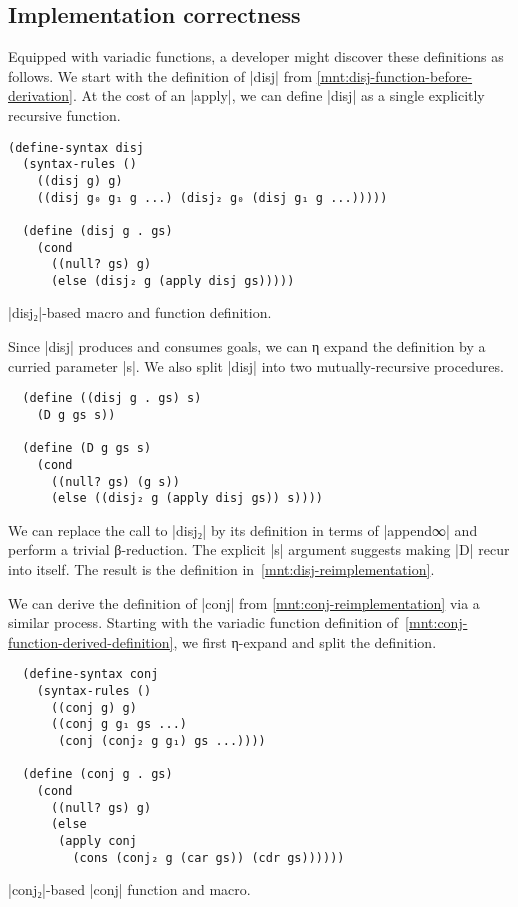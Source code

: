 \documentclass[sigplan,screen,draft,anonymous,review,natbib=false]{acmart}
\begin{document}
\subsection{Implementation correctness}

Equipped with variadic functions, a developer might discover these
definitions as follows. We start with the definition of
\rackinline|disj| from \cref{mnt:disj-function-before-derivation}. At
the cost of an \rackinline|apply|, we can define \rackinline|disj| as
a single explicitly recursive function.

\begin{listing}[h]
\begin{verbatim}
(define-syntax disj
  (syntax-rules ()
    ((disj g) g)
    ((disj g₀ g₁ g ...) (disj₂ g₀ (disj g₁ g ...)))))

  (define (disj g . gs)
    (cond
      ((null? gs) g)
      (else (disj₂ g (apply disj gs)))))
\end{verbatim}
  \caption{\rackinline|disj₂|-based macro and function definition.}
  \label{mnt:disj-function-before-derivation}
\end{listing}

\noindent Since \rackinline|disj| produces and consumes goals, we can
η expand the definition by a curried parameter \rackinline|s|. We also
split \rackinline|disj| into two mutually-recursive procedures.

\begin{verbatim}
  (define ((disj g . gs) s)
    (D g gs s))

  (define (D g gs s)
    (cond
      ((null? gs) (g s))
      (else ((disj₂ g (apply disj gs)) s))))
\end{verbatim}

\noindent We can replace the call to \rackinline|disj₂| by its
definition in terms of \rackinline|append∞| and perform a trivial
β-reduction. The explicit \rackinline|s| argument suggests making
\rackinline|D| recur into itself. The result is the definition
in~\cref{mnt:disj-reimplementation}.

We can derive the definition of \rackinline|conj| from
\cref{mnt:conj-reimplementation} via a similar process. Starting with
the variadic function definition
of~\cref{mnt:conj-function-derived-definition}, we first η-expand and
split the definition.

\begin{listing}
\begin{verbatim}
  (define-syntax conj
    (syntax-rules ()
      ((conj g) g)
      ((conj g g₁ gs ...)
       (conj (conj₂ g g₁) gs ...))))

  (define (conj g . gs)
    (cond
      ((null? gs) g)
      (else
       (apply conj
         (cons (conj₂ g (car gs)) (cdr gs))))))
\end{verbatim}
  \caption{\rackinline|conj₂|-based \rackinline|conj| function and macro.}
  \label{mnt:conj-function-derived-definition}
\end{listing}
\end{document}
